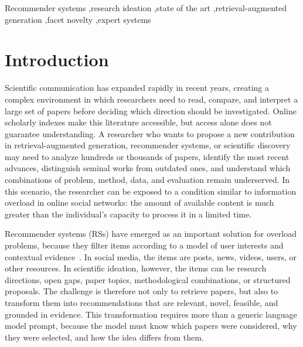 \documentclass[preprint,12pt]{elsarticle}
\begin{document}
\begin{frontmatter}
\begin{keyword}
Recommender systems \sep research ideation \sep state of the art \sep retrieval-augmented generation \sep facet novelty \sep expert systems
\end{keyword}

\end{frontmatter}

\section{Introduction}
\label{sec:intro}

Scientific communication has expanded rapidly in recent years, creating a complex environment in which researchers need to read, compare, and interpret a large set of papers before deciding which direction should be investigated. Online scholarly indexes make this literature accessible, but access alone does not guarantee understanding. A researcher who wants to propose a new contribution in retrieval-augmented generation, recommender systems, or scientific discovery may need to analyze hundreds or thousands of papers, identify the most recent advances, distinguish seminal works from outdated ones, and understand which combinations of problem, method, data, and evaluation remain underserved. In this scenario, the researcher can be exposed to a condition similar to information overload in online social networks: the amount of available content is much greater than the individual's capacity to process it in a limited time.

Recommender systems (RSs) have emerged as an important solution for overload problems, because they filter items according to a model of user interests and contextual evidence~\cite{adomavicius2005toward,ricci2015handbook}. In social media, the items are posts, news, videos, users, or other resources. In scientific ideation, however, the items can be research directions, open gaps, paper topics, methodological combinations, or structured proposals. The challenge is therefore not only to retrieve papers, but also to transform them into recommendations that are relevant, novel, feasible, and grounded in evidence. This transformation requires more than a generic language model prompt, because the model must know which papers were considered, why they were selected, and how the idea differs from them.
\end{document}
